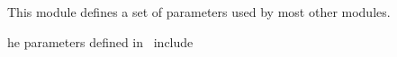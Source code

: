 
\sloppy


 \section[healpix\_types module]{ }
\label{sub:healpix_types}
\author{Eric Hivon}

\begin{facility}
{This module defines a set of parameters used by most other
\healpix modules.}
{\modHealpixTypes}
\end{facility}


\newenvironment{mytable}[1]{%
\begin{minipage}[b]{\linewidth}{%
\renewcommand{\thefootnote}{\fnsymbol{footnote}}
\renewcommand{\footnoterule}{}
{#1}
}%
\end{minipage}
}%

The parameters defined in \thedocid\ include

